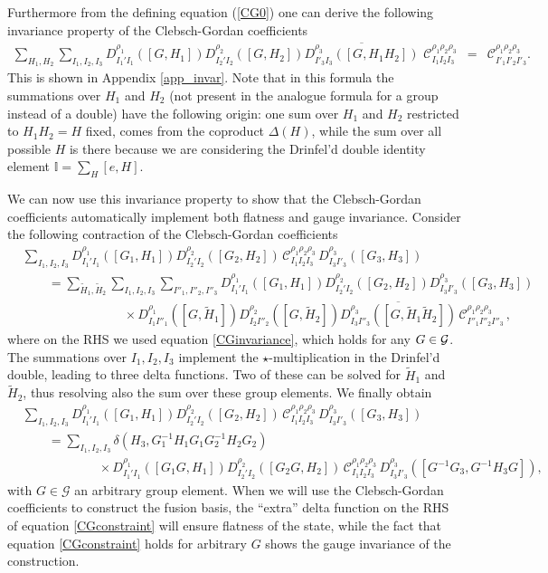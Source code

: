 \documentclass[nofootinbib,superscriptaddress,eqsecnum,tightenlines,11pt]{revtex4-1}
\def\nn{\nonumber}
\def\q{\qquad}
\def\mG{\mathcal{G}}
\def\ba{\begin{eqnarray}}
\def\ea{\end{eqnarray}}
\renewcommand{\tilde}{\widetilde}
\begin{document}
Furthermore from the defining equation (\ref{CG0}) one can derive the following invariance property of the Clebsch-Gordan coefficients
\ba\label{CGinvariance}
\sum_{H_1,H_2} \sum_{I_1,I_2,I_3} 
D^{\rho_1}_{I_1'I_1}([G,H_1])   D^{\rho_2}_{I_2'I_2}([G,H_2]) \overline{ D^{\rho_3}_{I'_3 I_3}([G, H_1H_2])  }
\,\,\mathcal{C}^{\rho_1 \rho_2\rho_3}_{I_1 I_2 I_3} &=&
\mathcal{C}^{\rho_1 \rho_2\rho_3}_{I'_1 I'_2 I'_3}.
\ea
This is shown in Appendix \ref{app_invar}. 
Note that in this formula the summations over $H_1$ and $H_2$ (not present in the analogue formula for a group instead of a double) have the following origin: one sum over $H_1$ and $H_2$ restricted to $H_1H_2=H$ fixed, comes from the coproduct $\Delta(H)$, while the sum over all possible $H$ is there because we are considering the Drinfel'd double identity element $\mathbb{I}=\sum_{H} [e,H]$.

We can now use this invariance property to show that the Clebsch-Gordan coefficients automatically implement both flatness and gauge invariance. Consider the following contraction of the Clebsch-Gordan coefficients
\begin{align}\label{CGconstraint0}
	&\sum_{I_1,I_2,I_3} 
	D^{\rho_1}_{I_1'I_1}([G_1,H_1])   D^{\rho_2}_{I_2'I_2}([G_2,H_2]) 
	\,\mathcal{C}^{\rho_1 \rho_2\rho_3}_{I_1 I_2 I_3}  \, D^{\rho_3}_{I_3 I'_3}([G_3, H_3])   \nn\\ &\q =
	\sum_{\tilde H_1, \tilde H_2}\sum_{I_1,I_2,I_3} \sum_{I''_1,I''_2,I''_3} 
	D^{\rho_1}_{I_1'I_1}([G_1,H_1])   D^{\rho_2}_{I_2'I_2}([G_2,H_2])  D^{\rho_3}_{I_3 I'_3}([G_3, H_3])  \nn\\
	&\q\q \q\q \times  D^{\rho_1}_{I_1I''_1}([G,\tilde H_1])   D^{\rho_2}_{I_2I''_2}([G,\tilde H_2]) \overline{ D^{\rho_3}_{I_3 I''_3}([G, \tilde H_1\tilde H_2])  }
	\,\mathcal{C}^{\rho_1 \rho_2\rho_3}_{I''_1 I''_2 I''_3} \,,
\end{align}
where on the RHS we used equation \eqref{CGinvariance}, which holds for any $G \in {\cal G}$. The summations over $I_1,I_2,I_3$ implement the $\star$-multiplication in the Drinfel'd double, leading to three delta functions. Two of these can be solved for $\tilde H_1$ and $\tilde H_2$, thus resolving also the sum over these group elements. We finally obtain
\begin{align}\label{CGconstraint}
	&\sum_{I_1,I_2,I_3} 
	D^{\rho_1}_{I_1'I_1}([G_1,H_1])   D^{\rho_2}_{I_2'I_2}([G_2,H_2]) 
	\,\mathcal{C}^{\rho_1 \rho_2\rho_3}_{I_1 I_2 I_3}  \, D^{\rho_3}_{I_3 I'_3}([G_3, H_3])   \nn\\ & \q =
	\sum_{I_1,I_2,I_3} 
	\delta(H_3, G_1^{-1} H_1 G_1 G_2^{-1} H_2 G_2) \nn\\
	&\q \q \q \times 
	D^{\rho_1}_{I_1'I_1}([G_1G,H_1])   D^{\rho_2}_{I_2'I_2}([G_2G,H_2]) 
	\,\mathcal{C}^{\rho_1 \rho_2\rho_3}_{I_1 I_2 I_3}  \, D^{\rho_3}_{I_3 I'_3}([G^{-1} G_3,  G^{-1} H_3 G]),
\end{align}
with $G\in\mG$ an arbitrary group element.
When we will use the Clebsch-Gordan coefficients to construct the fusion basis, the ``extra'' delta function on the RHS of equation \eqref{CGconstraint} will ensure flatness of the state, while the fact that equation \eqref{CGconstraint} holds for arbitrary $G$ shows the gauge invariance of the construction. 
\end{document}
